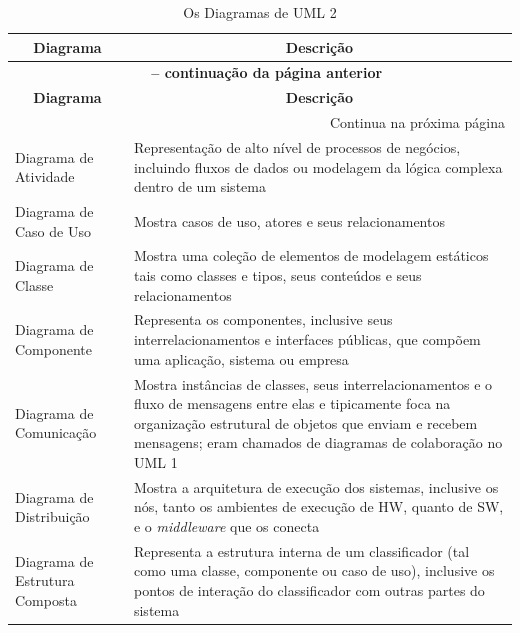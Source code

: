 \begin{longtable}[l]{p{4.7cm}p{11cm}}
\caption[Diagramas UML]{Os Diagramas de UML 2} \label{tab:diaUML}\\

\multicolumn{1}{c}{\textbf{Diagrama}} & \multicolumn{1}{c}{\textbf{Descrição}} \\
\midrule
\endfirsthead

\multicolumn{2}{c}{{\bfseries \tablename\ \thetable{} -- continuação da página anterior}} \\
\multicolumn{1}{c}{\textbf{Diagrama}} & \multicolumn{1}{c}{\textbf{Descrição}} \\
\midrule
\endhead

\multicolumn{2}{r}{{Continua na próxima página}} \\%
\endfoot

\hline %
\endlastfoot

Diagrama de Atividade & Representação de alto nível de processos de negócios, incluindo fluxos de dados ou modelagem da lógica complexa dentro de um sistema \\

Diagrama de Caso de  Uso & Mostra casos de uso, atores e seus relacionamentos \\

Diagrama de Classe & Mostra uma coleção de elementos de modelagem estáticos tais como classes e tipos, seus conteúdos e seus relacionamentos \\

Diagrama de Componente & Representa os componentes, inclusive seus interrelacionamentos e interfaces públicas, que compõem uma aplicação, sistema ou empresa \\

Diagrama de Comunicação & Mostra instâncias de classes, seus interrelacionamentos e o fluxo de mensagens entre elas e tipicamente foca na organização estrutural de objetos que enviam e recebem mensagens; eram chamados de diagramas de colaboração no UML 1 \\

Diagrama de Distribuição & Mostra a arquitetura de execução dos sistemas, inclusive os nós, tanto os ambientes de execução de HW, quanto de SW, e o \textit{middleware} que os conecta \\

Diagrama de Estrutura Composta & Representa a estrutura interna de um classificador (tal como uma classe, componente ou caso de uso), inclusive os pontos de interação do classificador com outras partes do sistema \\


\end{longtable}

